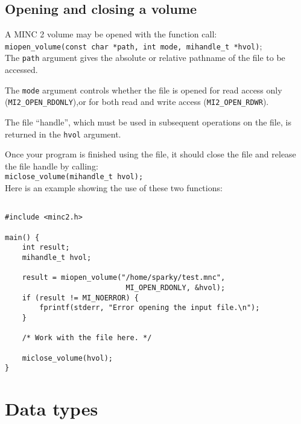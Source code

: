 \documentclass{article}
\begin{document}
\subsection{Opening and closing a volume}
A MINC 2 volume may be opened with the function call: \\

{\tt miopen\_volume(const char *path, int mode, mihandle\_t *hvol)}; \\

The {\tt path} argument gives the absolute or relative pathname of the
file to be accessed.

The {\tt mode} argument controls whether the file is opened for read
access only \\
({\tt MI2\_OPEN\_RDONLY}),or for both read and write access ({\tt MI2\_OPEN\_RDWR}). 

The file ``handle'', which must be used in subsequent operations on the
file, is returned in the {\tt hvol} argument.

Once your program is finished using the file, it should close the file
and release the file handle by calling:\\

{\tt miclose\_volume(mihandle\_t hvol);} \\

Here is an example showing the use of these two functions:

\begin{verbatim}

#include <minc2.h>

main() {
    int result;
    mihandle_t hvol;

    result = miopen_volume("/home/sparky/test.mnc", 
                            MI_OPEN_RDONLY, &hvol);
    if (result != MI_NOERROR) {
        fprintf(stderr, "Error opening the input file.\n");
    }

    /* Work with the file here. */

    miclose_volume(hvol);
}
\end{verbatim}

\newpage
\section{Data types}
\end{document}
